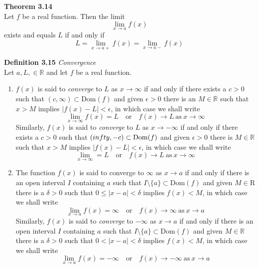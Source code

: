 \documentclass[8pt,landscape]{article}
\begin{document}
\begin{multicols}{3}
    \textbf{Theorem 3.14} \\
    Let $f$ be a real function.
    Then the limit
    \[
        \lim_{x \to a} f(x)
    \]
    exists and equals $L$ if and only if
    \[
        L = \lim_{x \to a+} f(x) = \lim_{x \to a-} f(x)
    \]


    \textbf{Definition 3.15} \emph{Convergence} \\
    Let $a, L, \in \mathbb{R}$ and let $f$ be a real function.
    \begin{enumerate}
        \item $f(x)$ is said to \emph{converge} to $L$ as $x \to \infty$ if and only if
            there exists a $c > 0$ such that $(c, \infty) \subset \mathrm{Dom}(f)$
            and given $\epsilon > 0$ there is an $M \in \mathbb{R}$ such that
            $x > M$ implies $|f(x) - L| < \epsilon$, in which case we shall write
            \[
                \lim_{x \to \infty} f(x) = L \quad \text{or} \quad
                f(x) \to L \ \text{as} \ x \to \infty
            \]
            Similarly, $f(x)$ is said to \emph{converge} to $L$ as $x \to -\infty$
            if and only if there exists a $c > 0$ such that
            $(\-infty, -c) \subset \mathrm{Dom}(f)$ and given $\epsilon > 0$ there is
            $M \in \mathbb{R}$ such that $x > M$ implies $|f(x) - L| < \epsilon$,
            in which case we shall write
            \[
                \lim_{x \to \infty} = L \quad \text{or} \quad
                f(x) \to L \ \text{as} \ x \to \infty
            \]
        \item The function $f(x)$ is said to converge to $\infty$ as $x \to a$
            if and only if there is an open interval $I$ containing $a$ such that
            $I \setminus \{a\} \subset \mathrm{Dom}(f)$ and given $M \in \mathrm{R}$
            there is a $\delta > 0$ such that $0 \leq |x - a| < \delta$ implies
            $f(x) < M$, in which case we shall write
            \[
                \lim_{x \to a} f(x) = \infty \quad \text{or} \quad
                f(x) \to \infty \ \text{as} \ x \to a
            \]
            Similarly, $f(x)$ is said to \emph{converge} to $-\infty$ as $x \to a$
            if and only if there is an open interval $I$ containing $a$ such that
            $I \setminus \{a\} \subset \mathrm{Dom}(f)$ and given $M \in \mathbb{R}$
            there is a $\delta > 0$ such that $0 < |x-a| < \delta$ implies $f(x) < M$,
            in which case we shall write
            \[
                \lim_{x \to a} f(x) = -\infty \quad \text{or} \quad
                f(x) \to -\infty \ \text{as} \ x \to a
            \]
    \end{enumerate}


\end{multicols}
\end{document}
